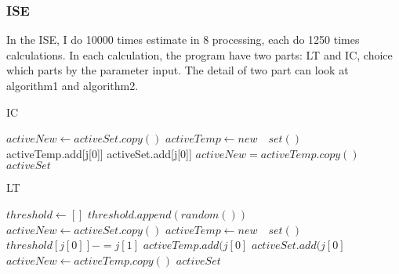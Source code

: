 \documentclass[conference,compsoc]{IEEEtran}
\begin{document}
    \subsubsection{ISE}
      In the ISE, I do 10000 times estimate in 8 processing, each do 1250 times calculations. In each calculation, the program have two parts: LT and IC, choice which parts by the parameter input. The detail of two part can look at algorithm1 and algorithm2.
      \begin{algorithm}
        \caption{IC}
        \begin{algorithmic}[1]
            \State $activeNew\gets activeSet.copy()$
              \State $activeTemp \gets new\quad set()$
                      \State activeTemp.add[j[0]]
                      \State activeSet.add[j[0]]
                    \EndIf
                  \EndIf
                \EndFor
              \EndFor
              \State $activeNew = activeTemp.copy()$
            \EndWhile
            \Return $activeSet$
          \EndFunction
        \end{algorithmic}
      \end{algorithm}


      \begin{algorithm}
        \caption{LT}
        \begin{algorithmic}[1]
            \State $threshold\gets []$
              \State $threshold.append(random())$
            \EndFor
            \State $activeNew\gets activeSet.copy()$
              \State $activeTemp\gets new\quad set()$
                    \State $threshold[j[0]]-=j[1]$
                      \State $activeTemp.add(j[0]$
                      \State $activeSet.add(j[0]$
                    \EndIf
                  \EndIf
                \EndFor
              \EndFor
              \State$activeNew\gets activeTemp.copy()$
            \EndWhile
            \Return $activeSet$
          \EndFunction
        \end{algorithmic}
      \end{algorithm}
\end{document}
